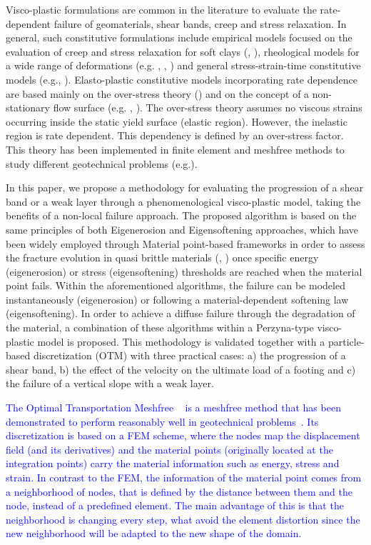 \documentclass[applsci,journal,article,submit,moreauthors,pdftex]{Definitions/mdpi}
\begin{document}
Visco-plastic formulations are common in the literature to evaluate the rate-dependent failure of geomaterials, shear bands, creep and stress relaxation. In general, such constitutive formulations include empirical models focused on the evaluation of creep and stress relaxation for soft clays (\cite{Bjerrum1967}, \cite{Kim2001}), rheological models for a wide range of deformations (e.g. \cite{Feda}, \cite{Dutto2017}, \cite{Manzanal2015}) and general stress-strain-time constitutive models (e.g.\cite{ADACHI1974}, \cite{HEERES20021}). Elasto-plastic constitutive models incorporating rate dependence are based mainly on the over-stress theory (\cite{Perzyna:66}) and on the concept of a non-stationary flow surface (e.g. \cite{Naghdi1963}, \cite{Nova1982}). The over-stress theory assumes no viscous strains occurring inside the static yield surface (elastic region). However, the inelastic region is rate dependent. This dependency is defined by an over-stress factor. This theory has been implemented in finite element and meshfree methods to study different geotechnical problems (e.g.\cite{Manzanal2015,BlancPastor2012}).  

In this paper, we propose a methodology for evaluating the progression of a shear band or a weak layer through a phenomenological visco-plastic model, taking the benefits of a non-local failure approach. The proposed algorithm is based on the same principles of both Eigenerosion and Eigensoftening approaches, which have been widely employed through Material point-based frameworks in order to assess the fracture evolution in quasi brittle materials (\cite{Navas2018a}, \cite{Molinos2020b}) once specific energy (eigenerosion) or stress (eigensoftening) thresholds are reached when the material point fails. Within the aforementioned algorithms, the failure can be modeled instantaneously (eigenerosion) or following a material-dependent softening law (eigensoftening). In order to achieve a diffuse failure through the degradation of the material, a combination of these algorithms within a Perzyna-type visco-plastic model is proposed. This methodology is validated together with a particle-based discretization (OTM) with three practical cases: a) the progression of a shear band, b) the effect of the velocity on the ultimate load of a footing and c) the failure of a vertical slope with a weak layer. 

\textcolor{blue}{The Optimal Transportation Meshfree ~\cite{li2010,li2014,Huang2019} is a meshfree method that has been demonstrated to perform reasonably well in geotechnical problems~\cite{Navas2020,Navas2021}. Its discretization is based on a FEM scheme, where the nodes map the displacement field (and its derivatives) and the material points (originally located at the integration points) carry the material information such as energy, stress and strain. In contrast to the FEM, the information of the material point comes from a neighborhood of nodes, that is defined by the distance between them and the node, instead of a predefined element. The main advantage of this is that the neighborhood is changing every step, what avoid the element distortion since the new neighborhood will be adapted to the new shape of the domain.}
\end{document}
